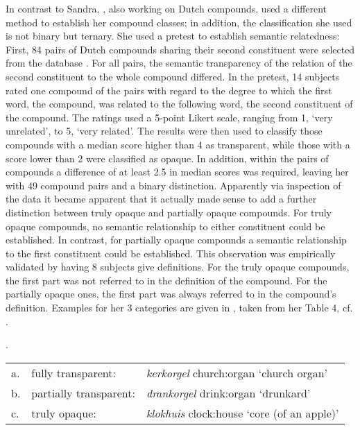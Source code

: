 
      In contrast to Sandra, \citet{Zwitserlood:1994}, also working on Dutch
      compounds, used a different method to establish her compound classes; in
      addition, the classification she used is not binary but ternary.
  She
      used a pretest to establish semantic relatedness:
      First, 84 pairs of Dutch compounds sharing their second constituent
      were selected from the  database \citep{Baayenetal:1995}. 
For all pairs, the semantic
      transparency of the relation of the second constituent to the whole
      compound differed. In the pretest, 14 subjects rated one
      compound of the pairs with regard to the degree to which the first word,
      the compound, was related to the following word, the second constituent
      of the compound. The ratings used a 5-point Likert scale, ranging from 1, `very
      unrelated', to 5, `very related'. The results were then used to classify
      those compounds with a median score higher than 4 as transparent, while
      those with a score lower than 2 were classified as opaque. In addition,
      within the pairs of compounds a difference of at least 2.5 in median
      scores was required, leaving her with 49 compound pairs and a binary
      distinction. Apparently via inspection of the data it became apparent
      that it actually made sense to add a further distinction
      between truly opaque and partially opaque compounds. For truly
      opaque compounds, no semantic relationship to either constituent
      could be established. In contrast, for partially opaque
      compounds a semantic
      relationship to the first constituent could be established. This
      observation was empirically validated by having 8 subjects give
      definitions. For the truly opaque compounds, the first part was not
      referred to in the definition of the compound. For the partially opaque ones, the first part was always
      referred to in the compound's definition. Examples for her 3 categories are given in \Next, taken from her
Table 4, cf. \citet[358]{Zwitserlood:1994}.

\ex.
\begin{tabular}[t]{lll}
a.&fully transparent:& \emph{kerkorgel} church:organ `church organ'  \\
b.&partially transparent:&\emph{drankorgel} drink:organ `drunkard'\\
c.&truly opaque:&\emph{klokhuis} clock:house `core (of an apple)'  
\end{tabular}

